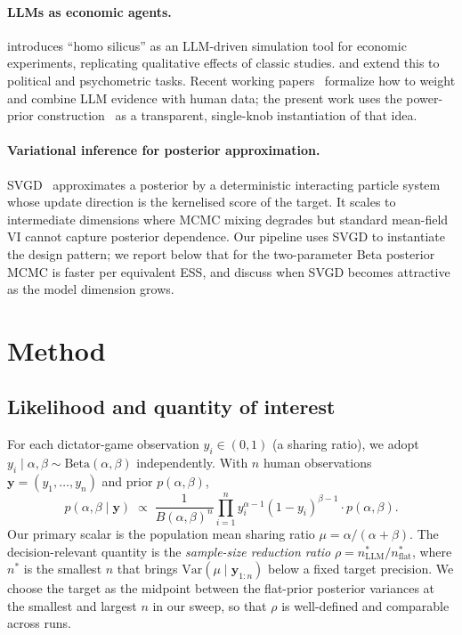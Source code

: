 \documentclass[11pt]{article}
\newcommand{\bsy}{\bm{y}}
\newcommand{\Beta}{\mathrm{Beta}}
\begin{document}
\paragraph{LLMs as economic agents.}
\citet{horton2023large} introduces ``homo silicus'' as an LLM-driven simulation tool for
economic experiments, replicating qualitative effects of classic studies. \citet{argyle2023silicon}
and \citet{aher2023using} extend this to political and psychometric tasks. Recent
working papers~\citep{gao2026measure, ludwig2025econometrics} formalize how to weight and
combine LLM evidence with human data; the present work uses the power-prior
construction~\citep{ibrahim2000power} as a transparent, single-knob instantiation of that idea.

\paragraph{Variational inference for posterior approximation.}
SVGD~\citep{liu2016stein} approximates a posterior by a deterministic interacting particle
system whose update direction is the kernelised score of the target. It scales to
intermediate dimensions where MCMC mixing degrades but standard mean-field VI cannot capture
posterior dependence. Our pipeline uses SVGD to instantiate the design pattern; we
report below that for the two-parameter Beta posterior MCMC is faster per equivalent ESS,
and discuss when SVGD becomes attractive as the model dimension grows.

\section{Method}

\subsection{Likelihood and quantity of interest}

For each dictator-game observation $y_i \in (0,1)$ (a sharing ratio), we adopt
$y_i \mid \alpha,\beta \sim \Beta(\alpha,\beta)$ independently. With $n$ human observations
$\bsy = (y_1, \ldots, y_n)$ and prior $p(\alpha, \beta)$,
\begin{equation}
  p(\alpha, \beta \mid \bsy) \;\propto\;
  \frac{1}{B(\alpha,\beta)^n}\prod_{i=1}^n y_i^{\alpha-1}(1-y_i)^{\beta-1}
  \cdot p(\alpha, \beta).
  \label{eq:posterior}
\end{equation}
Our primary scalar is the population mean sharing ratio $\mu = \alpha/(\alpha+\beta)$.
The decision-relevant quantity is the \emph{sample-size reduction ratio}
$\rho = n^*_{\mathrm{LLM}}/n^*_{\mathrm{flat}}$, where $n^*$ is the smallest $n$ that
brings $\mathrm{Var}(\mu \mid \bsy_{1:n})$ below a fixed target precision. We choose the
target as the midpoint between the flat-prior posterior variances at the smallest and
largest $n$ in our sweep, so that $\rho$ is well-defined and comparable across runs.
\end{document}
